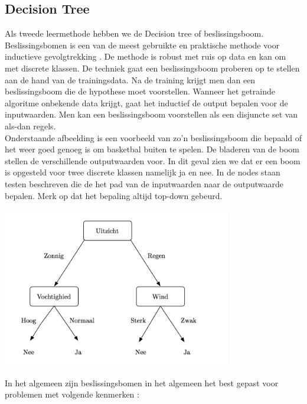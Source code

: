 \subsection{Decision Tree}\label{Decision Tree}
%
Als tweede leermethode hebben we de Decision tree of beslissingsboom. Beslissingsbomen is een van de meest gebruikte en praktische methode voor inductieve gevolgtrekking \cite{mitchell1997machine}. De methode is robust met ruis op data en kan om met discrete klassen. De techniek gaat een beslissingsboom proberen op te stellen aan de hand van de trainingsdata. Na de training krijgt men dan een beslissingsboom die de hypothese moet voorstellen. Wanneer het getrainde algoritme onbekende data krijgt, gaat het inductief de output bepalen voor de inputwaarden. Men kan een beslissingsboom voorstellen als een disjuncte set van als-dan regels.\\ 
%
Onderstaande afbeelding is een voorbeeld van zo'n beslissingsboom die bepaald of het weer goed genoeg is om basketbal buiten te spelen. De bladeren van de boom stellen de verschillende outputwaarden voor. In dit geval zien we dat er een boom is opgesteld voor twee discrete klassen namelijk ja en nee. In de nodes staan testen beschreven die de het pad van de inputwaarden naar de outputwaarde bepalen. Merk op dat het bepaling altijd top-down gebeurd.
%
\begin{center}
  \includegraphics[width=10cm]{decisiontree}
  \label{fig:beslissingsboom}
\end{center}
%
In het algemeen zijn beslissingsbomen in het algemeen het best gepast voor problemen met volgende kenmerken \cite{mitchell1997machine}: 

